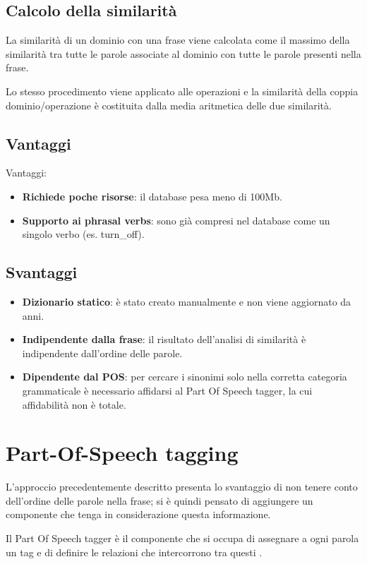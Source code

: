 \documentclass[twoside]{supsistudent}
\begin{document}
\subsection{Calcolo della similarità}
La similarità di un dominio con una frase viene calcolata come il massimo della similarità tra tutte le parole associate al dominio con tutte le parole presenti nella frase.

Lo stesso procedimento viene applicato alle operazioni e la similarità della coppia dominio/operazione è costituita dalla media aritmetica delle due similarità.
\subsection{Vantaggi}
Vantaggi:
 \begin{itemize}
  \item \textbf{Richiede poche risorse}: il database pesa meno di 100Mb.
  \item \textbf{Supporto ai phrasal verbs}: sono già compresi nel database come un singolo verbo (es. turn\_off).
\end{itemize}
\subsection{Svantaggi}
\begin{itemize}
  \item \textbf{Dizionario statico}: è stato creato manualmente e non viene aggiornato da anni.  
  \item \textbf{Indipendente dalla frase}: il risultato dell'analisi di similarità è indipendente dall'ordine delle parole.
  \item \textbf{Dipendente dal POS}: per cercare i sinonimi solo nella corretta categoria grammaticale è necessario affidarsi al Part Of Speech tagger, la cui affidabilità non è totale.
\end{itemize}
\newpage
\section{Part-Of-Speech tagging}
L'approccio precedentemente descritto presenta lo svantaggio di non tenere conto dell'ordine delle parole nella frase; si è quindi pensato di aggiungere un componente che tenga in considerazione questa informazione.

Il Part Of Speech tagger è il componente che si occupa di assegnare a ogni parola un tag e di definire le relazioni che intercorrono tra questi .\cite{pos}\cite{posCategories}
\end{document}
